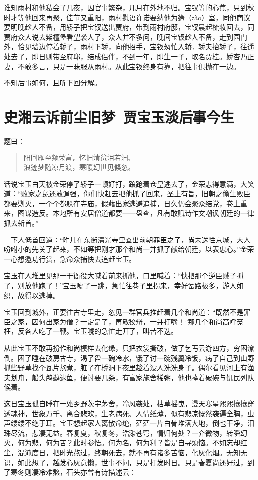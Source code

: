 \documentclass[12pt,oneside]{book}
\newenvironment{shici}{%
\begin{verse}%
\centering\large\hspace{12pt}}%
{\end{verse}}
\begin{document}
谁知雨村和他私会了几夜，因官事繁杂，几月在外地不归。宝钗等的心焦，只到秋时才等他回来再聚，佳节又重阳，雨村慰语许诺要纳他为簉（zào）室，同他商议要明晚趁人不备，用轿子把宝钗送出贾府，带到雨村府邸，宝钗晨起梳妆回去，同贾府众人说去紫檀堡看望袭人了，众人并不多问，晚间宝钗趁人不备，走到园门外，恰见墙边停着轿子，雨村下轿，向他招手，宝钗匆忙入轿，轿夫抬轿子，往遥处去了，即日则带至府邸，结成侣伴，不到一年，即生一子，取名贾桂。娇杏乃正妻，不敢多言，只是一昧服从雨村。从此宝钗终身有靠，把往事俱抛在一边。

不知后事如何，且听下回分解。
 
 
\chapter{史湘云诉前尘旧梦~贾宝玉淡后事今生}
题曰：

\begin{shici}
阳回雁至频荣富，忆旧清贫泪若汩。\\
浪迹梦随凉月渡，寒暖幻世见倏忽。
\end{shici}


话说宝玉白天被金荣停了轿子一顿好打，踉跄着仓皇逃去了，金荣志得意满，大笑道：“败家之彘还敢逞强，你们快赶去把他抓了回来，圣上有旨，旧朝之偷生败臣都要剿灭，一个个都躲在寺庙，假藉出家逃避追捕，日久仍会聚众结党，卷土重来，图谋造反。本地所有安居僧道都要一一盘查，凡有敢赋诗作文嘲讽朝廷的一律抓去斩首。”

一下人低首回道：“昨儿在东街清光寺里查出前朝罪臣之子，尚未送往京城，大人吩咐小的先关了起来，不如等把刚才那个和尚一并抓了献给朝廷，以表忠心。”金荣一心想邀功行赏，急命众捕快去追赶宝玉。

宝玉在人堆里见那一干衙役大喊着前来抓他，口里喊着：“快把那个逆臣贼子抓了，别放他跑了！”宝玉唬了一跳，急忙往巷子里拐来，幸好岔路极多，游人如织，故得以逃掉。

宝玉回到城外，正要往古寺里走，忽见一群官兵推赶着几个和尚道：“既然不是罪臣之家，因何出家为僧？一定是了，再敢狡辩，一并打嘴！”那几个和尚高呼冤枉，反各人吃了一鞭。宝玉唬的急忙走开了，叫苦不迭。

从此宝玉不敢再扮作和尚模样去化缘，只把衣裳撕破，做了乞丐云游四方，穷困潦倒。困了睡在破房古寺，渴了舀一碗冷水，饿了讨一碗残羹冷饭，病了自己到山野抓些野草找个瓦片熬煮，脏了在桥洞下夜里趁着没人洗洗身子。偶尔看见河上有渔夫划舟，船头鸬鹚逮鱼，便讨要几条，有富家施舍稀粥，他也捧着破碗与饥民列队候着。

这日宝玉孤自睡在一处乡野茨宇茅舍，冷风袭处，枯草摇曳，漫天寒星熙熙攘攘穿透魂神，世象万千、离合悲欢，生老病死、人情纸薄，似有悲凉慨然袭遍全胸，虫声缕缕不绝于耳。宝玉想起家人离散命绝，茫茫一片白骨堆满大地，倒也干净，泪珠尽流，悲凄无益。春复夏，秋复冬，浩渺苍穹，情归何处？一介微物，转瞬幻灭，何为悲，何为苦？此时参悟。何为名，何为利？皆是自寻烦恼。不如忘却红尘，混沌度日，把时光熬过，终朝死去，就不再有诸多苦恼，化灰化烟。无知无识，如此想了，越发心灰意懒，世事不问，只是打发时日。只是春夏尚还好过，到了寒冬则凄冷难熬，石头亦曾有诗描述云：
\end{document}
